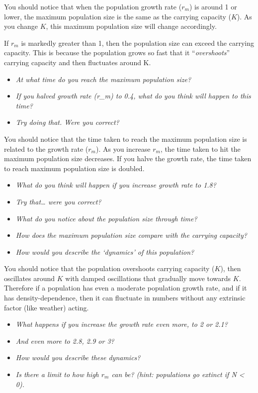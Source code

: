 \documentclass[
  a4paper]{book}
\providecommand{\tightlist}{%
  \setlength{\itemsep}{0pt}\setlength{\parskip}{0pt}}
\begin{document}
You should notice that when the population growth rate (\(r_m\)) is around 1 or lower, the maximum population size is the same as the carrying capacity (\(K\)). As you change \(K\), this maximum population size will change accordingly.

If \(r_m\) is markedly greater than 1, then the population size can exceed the carrying capacity. This is because the population grows so fast that it ``\emph{overshoots}'' carrying capacity and then fluctuates around K.

\begin{itemize}
\tightlist
\item
  \emph{At what time do you reach the maximum population size?}
\item
  \emph{If you halved growth rate (r\_m) to 0.4, what do you think will happen to this time? }
\item
  \emph{Try doing that. Were you correct?}
\end{itemize}

You should notice that the time taken to reach the maximum population size is related to the growth rate (\(r_m\)). As you increase \(r_m\), the time taken to hit the maximum population size decreases. If you halve the growth rate, the time taken to reach maximum population size is doubled.

\begin{itemize}
\tightlist
\item
  \emph{What do you think will happen if you increase growth rate to 1.8?}
\item
  \emph{Try that\ldots{} were you correct?}
\item
  \emph{What do you notice about the population size through time?}
\item
  \emph{How does the maximum population size compare with the carrying capacity?}
\item
  \emph{How would you describe the `dynamics' of this population?}
\end{itemize}

You should notice that the population overshoots carrying capacity (\(K\)), then oscillates around \(K\) with damped oscillations that gradually move towards \(K\). Therefore if a population has even a moderate population growth rate, and if it has density-dependence, then it can fluctuate in numbers without any extrinsic factor (like weather) acting.

\begin{itemize}
\tightlist
\item
  \emph{What happens if you increase the growth rate even more, to 2 or 2.1?}
\item
  \emph{And even more to 2.8, 2.9 or 3?}
\item
  \emph{How would you describe these dynamics?}
\item
  \emph{Is there a limit to how high \(r_m\) can be? (hint: populations go extinct if N \textless{} 0).}
\end{itemize}
\end{document}
